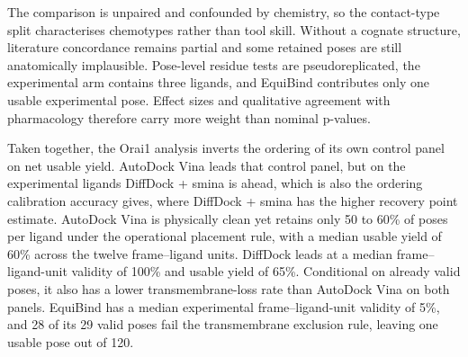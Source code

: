 The comparison is unpaired and confounded by chemistry, so the contact-type split characterises chemotypes rather than tool skill. Without a cognate structure, literature concordance remains partial and some retained poses are still anatomically implausible. Pose-level residue tests are pseudoreplicated, the experimental arm contains three ligands, and EquiBind contributes only one usable experimental pose. Effect sizes and qualitative agreement with pharmacology therefore carry more weight than nominal p-values.

Taken together, the Orai1 analysis inverts the ordering of its own control panel on net usable yield. AutoDock Vina leads that control panel, but on the experimental ligands DiffDock + smina is ahead, which is also the ordering calibration accuracy gives, where DiffDock + smina has the higher recovery point estimate. AutoDock Vina is physically clean yet retains only 50 to 60\% of poses per ligand under the operational placement rule, with a median usable yield of 60\% across the twelve frame--ligand units. DiffDock leads at a median frame--ligand-unit validity of 100\% and usable yield of 65\%. Conditional on already valid poses, it also has a lower transmembrane-loss rate than AutoDock Vina on both panels. EquiBind has a median experimental frame--ligand-unit validity of 5\%, and 28 of its 29 valid poses fail the transmembrane exclusion rule, leaving one usable pose out of 120.

